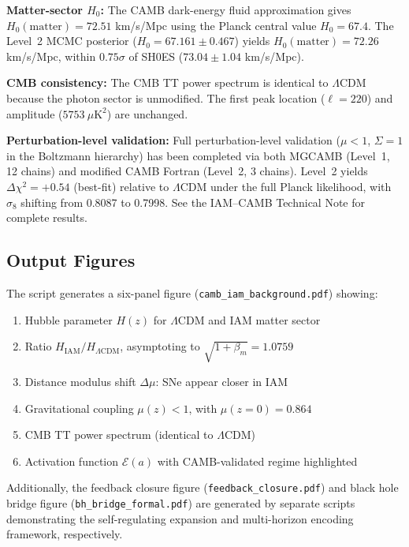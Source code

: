 \documentclass[11pt]{article}
\begin{document}
\textbf{Matter-sector $H_0$:} The CAMB dark-energy fluid approximation gives $H_0(\text{matter}) = 72.51$ km/s/Mpc using the Planck central value $H_0 = 67.4$. The Level~2 MCMC posterior ($H_0 = 67.161 \pm 0.467$) yields $H_0(\text{matter}) = 72.26$ km/s/Mpc, within $0.75\sigma$ of SH0ES ($73.04 \pm 1.04$ km/s/Mpc).

\textbf{CMB consistency:} The CMB TT power spectrum is identical to $\Lambda$CDM because the photon sector is unmodified. The first peak location ($\ell = 220$) and amplitude ($5753~\mu\text{K}^2$) are unchanged.

\textbf{Perturbation-level validation:} Full perturbation-level validation ($\mu < 1$, $\Sigma = 1$ in the Boltzmann hierarchy) has been completed via both MGCAMB (Level~1, 12 chains) and modified CAMB Fortran (Level~2, 3 chains). Level~2 yields $\Delta\chi^2 = +0.54$ (best-fit) relative to $\Lambda$CDM under the full Planck likelihood, with $\sigma_8$ shifting from 0.8087 to 0.7998. See the IAM--CAMB Technical Note for complete results.

\subsection{Output Figures}

The script generates a six-panel figure (\texttt{camb\_iam\_background.pdf}) showing:
\begin{enumerate}
    \item[(a)] Hubble parameter $H(z)$ for $\Lambda$CDM and IAM matter sector
    \item[(b)] Ratio $H_\text{IAM}/H_{\Lambda\text{CDM}}$, asymptoting to $\sqrt{1 + \beta_m} = 1.0759$
    \item[(c)] Distance modulus shift $\Delta\mu$: SNe appear closer in IAM
    \item[(d)] Gravitational coupling $\mu(z) < 1$, with $\mu(z=0) = 0.864$
    \item[(e)] CMB TT power spectrum (identical to $\Lambda$CDM)
    \item[(f)] Activation function $\mathcal{E}(a)$ with CAMB-validated regime highlighted
\end{enumerate}

Additionally, the feedback closure figure (\texttt{feedback\_closure.pdf}) and black hole bridge figure (\texttt{bh\_bridge\_formal.pdf}) are generated by separate scripts demonstrating the self-regulating expansion and multi-horizon encoding framework, respectively.
\end{document}
